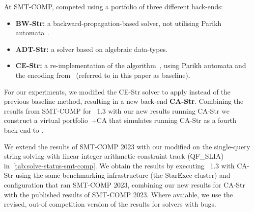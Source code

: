  At SMT-COMP, \Ostrich{} competed using a portfolio of three different
 back-ends:
\begin{itemize}
\item \textbf{BW-Str:} a backward-propagation-based solver, not utilising
  Parikh automata~\cite{ostrich}.
\item \textbf{ADT-Str:} a solver based on algebraic data-types.
\item \textbf{CE-Str:} a re-implementation of the \OstrichPlus{}
  algorithm~\cite{ostrich-plus}, using Parikh automata and the
  encoding from~\cite{generate-parikh-image} (referred to in this paper as baseline).
\end{itemize}

For our experiments, we modified the CE-Str solver to apply \Catra{}
instead of the previous baseline method, resulting in a new back-end
\textbf{CA-Str}. Combining the results from SMT-COMP for \Ostrich{}~1.3 
with our new results running CA-Str we construct a virtual 
portfolio~\Ostrich{}+CA that simulates running CA-Str as a fourth
back-end to \Ostrich{}.

%
%

We extend the results of SMT-COMP 2023 with our modified \Ostrich
on the single-query string solving with linear integer arithmetic constraint
track (QF\_SLIA) in~\cref{tab:solve-status-smt-comp}. We obtain
the results by executing \Ostrich~1.3 with CA-Str using
the same benchmarking infrastructure (the StarExec cluster)
and configuration that ran SMT-COMP 2023, combining our new results for CA-Str with the
published results of SMT-COMP 2023. Where avaiable, we use the revised, out-of
competition version of the results for solvers with bugs.

